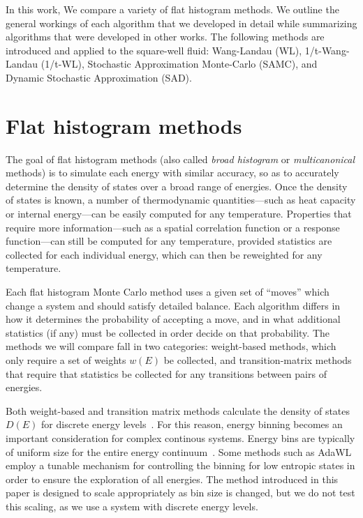 \documentclass[letterpaper,twocolumn,amsmath,amssymb,pre,aps,10pt]{revtex4-1}
\begin{document}
In this work, We compare a variety of flat histogram
methods.  We outline the general workings of each algorithm that we
developed in detail while summarizing algorithms that were developed in other
works.  The following methods are introduced and applied to the
square-well fluid: Wang-Landau (WL), 1/t-Wang-Landau (1/t-WL), Stochastic
Approximation Monte-Carlo (SAMC), and Dynamic Stochastic Approximation (SAD).


\section{Flat histogram methods}\label{sec:histogram}

The goal of flat histogram methods (also called \emph{broad histogram}
or \emph{multicanonical} methods) is to simulate each energy with
similar accuracy, so as to accurately determine the density of states
over a broad range of energies.  Once the density of states is known,
a number of thermodynamic quantities---such as heat capacity or
internal energy---can be easily computed for any temperature.
Properties that require more information---such as a spatial
correlation function or a response function---can still be computed
for any temperature, provided statistics are collected for each
individual energy, which can then be reweighted for any temperature.

Each flat histogram Monte Carlo method uses a given set of ``moves''
which change a system and should satisfy detailed balance.  Each
algorithm differs in how it determines the probability of accepting a
move, and in what additional statistics (if any) must be collected in
order decide on that probability.  The methods we will compare fall in
two categories:  weight-based methods, which only require a set of
weights $w(E)$ be collected, and transition-matrix methods that
require that statistics be collected for any transitions between pairs
of energies.

Both weight-based and transition matrix methods calculate
the density of states $D(E)$ for discrete energy
levels~\cite{haber2018performance}. For this reason, energy binning
becomes an important consideration for complex continous systems.
Energy bins are typically of uniform size for the entire energy
continuum~\cite{fasnacht2004adaptive}. Some methods such as
AdaWL~\cite{koh2013dynamically}
employ a tunable mechanism for controlling the binning for low entropic
states in order to ensure the exploration of all energies.  The method
introduced in this paper is designed to scale appropriately as bin size
is changed, but we do not test this scaling, as we use a system with
discrete energy levels.
\end{document}
